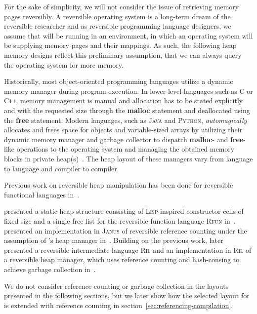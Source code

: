 For the sake of simplicity, we will not consider the issue of retrieving memory pages reversibly. A reversible operating system is a long-term dream of the reversible researcher and as reversible programming language designers, we assume that \rooplpp will be running in an environment, in which an operating system will be supplying memory pages and their mappings. As such, the following heap memory designs reflect this preliminary assumption, that we can always query the operating system for more memory. 

Historically, most object-oriented programming languages utilize a dynamic memory manager during program execution. In lower-level languages such as \textsc{C} or \textsc{C\texttt{++}}, memory management is manual and allocation has to be stated explicitly and with the requested size through the \textbf{malloc} statement and deallocated using the \textbf{free} statement. Modern languages, such as \textsc{Java} and \textsc{Python}, \textit{automagically} allocates and frees space for objects and variable-sized arrays by utilizing their dynamic memory manager and garbage collector to dispatch \textbf{malloc}- and \textbf{free}-like operations to the operating system and managing the obtained memory blocks in private heap(s)~\cite{wh:cpp_memory, bv:jvm, py:memory}. The heap layout of these managers vary from language to language and compiler to compiler.

Previous work on reversible heap manipulation has been done for reversible functional languages in~\cite{ha:heap, jsk:translation, tm:garbage}.

\citeauthor{ha:heap} presented a static heap structure consisting of \textsc{Lisp}-inspired constructor cells of fixed size and a single free list for the reversible function language \textsc{Rfun} in~\cite{ha:heap}. \citeauthor{tm:refcounting} presented an implementation in \textsc{Janus} of reversible reference counting under the assumption of \citeauthor{ha:heap}'s heap manager in~\cite{tm:refcounting}. Building on the previous work, \citeauthor{tm:garbage} later presented a reversible intermediate language \textsc{Ril} and an implementation in \textsc{Ril} of a reversible heap manager, which uses reference counting and hash-consing to achieve garbage collection in~\cite{tm:garbage}.

We do not consider reference counting or garbage collection in the layouts presented in the following sections, but we later show how the selected layout for \rooplpp is extended with reference counting in section~\ref{sec:referencing-compilation}.

